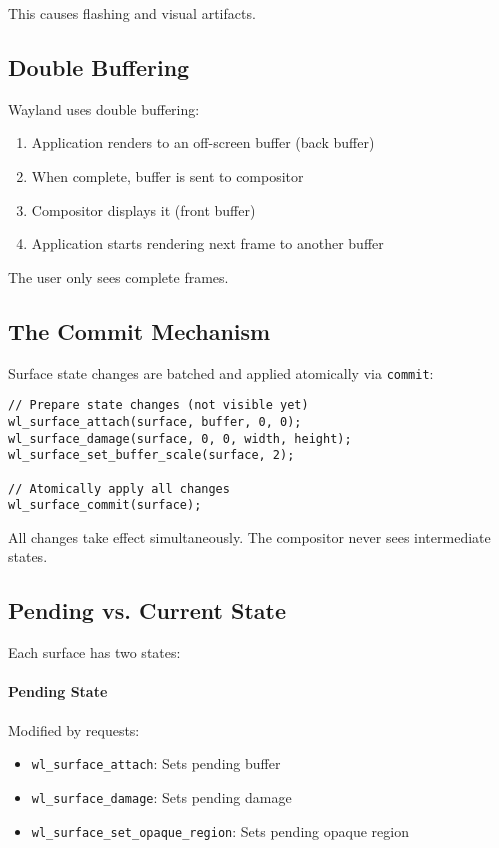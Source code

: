 This causes flashing and visual artifacts.

\subsection{Double Buffering}

Wayland uses double buffering:

\begin{enumerate}
    \item Application renders to an off-screen buffer (back buffer)
    \item When complete, buffer is sent to compositor
    \item Compositor displays it (front buffer)
    \item Application starts rendering next frame to another buffer
\end{enumerate}

The user only sees complete frames.

\subsection{The Commit Mechanism}

Surface state changes are batched and applied atomically via \texttt{commit}:

\begin{lstlisting}[style=cstyle, caption=Atomic State Updates]
// Prepare state changes (not visible yet)
wl_surface_attach(surface, buffer, 0, 0);
wl_surface_damage(surface, 0, 0, width, height);
wl_surface_set_buffer_scale(surface, 2);

// Atomically apply all changes
wl_surface_commit(surface);
\end{lstlisting}

All changes take effect simultaneously. The compositor never sees intermediate states.

\subsection{Pending vs. Current State}

Each surface has two states:

\paragraph{Pending State}
Modified by requests:
\begin{itemize}
    \item \texttt{wl\_surface\_attach}: Sets pending buffer
    \item \texttt{wl\_surface\_damage}: Sets pending damage
    \item \texttt{wl\_surface\_set\_opaque\_region}: Sets pending opaque region
\end{itemize}

